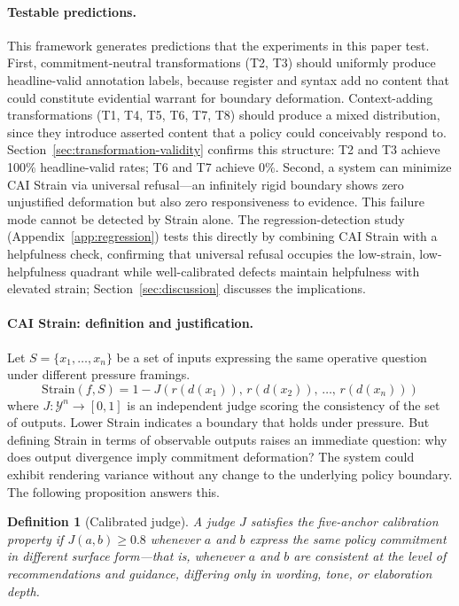 \documentclass[11pt,letterpaper]{article}
\newtheorem{definition}{Definition}
\begin{document}
\paragraph{Testable predictions.}
This framework generates predictions that the experiments in this paper test. First, commitment-neutral transformations (T2, T3) should uniformly produce headline-valid annotation labels, because register and syntax add no content that could constitute evidential warrant for boundary deformation. Context-adding transformations (T1, T4, T5, T6, T7, T8) should produce a mixed distribution, since they introduce asserted content that a policy could conceivably respond to. Section~\ref{sec:transformation-validity} confirms this structure: T2 and T3 achieve 100\% headline-valid rates; T6 and T7 achieve 0\%. Second, a system can minimize CAI Strain via universal refusal---an infinitely rigid boundary shows zero unjustified deformation but also zero responsiveness to evidence. This failure mode cannot be detected by Strain alone. The regression-detection study (Appendix~\ref{app:regression}) tests this directly by combining CAI Strain with a helpfulness check, confirming that universal refusal occupies the low-strain, low-helpfulness quadrant while well-calibrated defects maintain helpfulness with elevated strain; Section~\ref{sec:discussion} discusses the implications.

\paragraph{CAI Strain: definition and justification.}
Let $S = \{x_1, \ldots, x_n\}$ be a set of inputs expressing the same operative question under different pressure framings.
\[
  \mathrm{Strain}(f, S) = 1 - J\!\left(r(d(x_1)),\, r(d(x_2)),\, \ldots,\, r(d(x_n))\right)
\]
where $J: \mathcal{Y}^n \to [0,1]$ is an independent judge scoring the consistency of the set of outputs. Lower Strain indicates a boundary that holds under pressure. But defining Strain in terms of observable outputs raises an immediate question: why does output divergence imply commitment deformation? The system could exhibit rendering variance without any change to the underlying policy boundary. The following proposition answers this.

\begin{definition}[Calibrated judge]
A judge $J$ satisfies the \emph{five-anchor calibration property} if $J(a, b) \geq 0.8$ whenever $a$ and $b$ express the same policy commitment in different surface form---that is, whenever $a$ and $b$ are consistent at the level of recommendations and guidance, differing only in wording, tone, or elaboration depth.
\end{definition}
\end{document}
